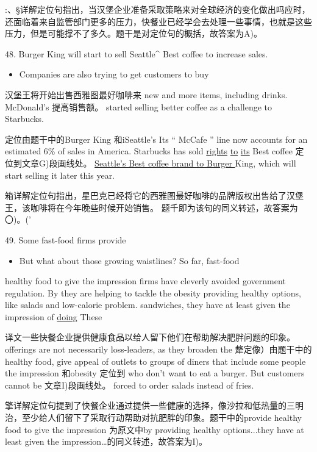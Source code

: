 \documentclass[UTF8,11pt]{ctexart}
\begin{document}
:、§详解定位句指出，当汉堡企业准备采取策略来对全球经济的变化做出吗应时，还面临着来自监管部门更多的压力，快餐业已经学会去处理一些事情，也就是这些压力，但是可能撑不了多久。题干是对定位句的概括，故答案为A)。


48. Burger King will start to sell Seattle\textasciicircum{} Best coffee to increase sales.


\begin{itemize}[leftmargin=2em,itemsep=.2em,topsep=.4em]\item[G.] Companies are also trying to get customers to buy
\end{itemize}

汉堡王将开始出售西雅图最好咖啡来 new and more items, including drinks. McDonald’s 提高销售额。 started selling better coffee as a challenge to Starbucks.


定位由题干中的Burger King 和iSeattle’s Its “ McCafe ” line now accounts for an estimated 6\% of sales in America. Starbucks has sold \uline{rights} \uline{to} \uline{its} Best coffee 定位到文章G)段画线处。 \uline{Seattle’s Best coffee brand to Burger }King, which will start selling it later this year.


箱详解定位句指出，星巴克已经将它的西雅图最好咖啡的品牌版权出售给了汉堡王，该咖啡将在今年晚些时候开始销售。 题千即为该句的同义转述，故答案为〇)。('


49. Some fast-food firms provide


\begin{itemize}[leftmargin=2em,itemsep=.2em,topsep=.4em]\item[I.] But what about those growing waistlines? So far, fast-food
\end{itemize}

healthy food to give the impression firms have cleverly avoided government regulation. By they are helping to tackle the obesity providing healthy options, like salads and low-calorie problem. sandwiches, they have at least given the impression of \uline{doing} These


译文一些快餐企业提供健康食品以给人留下他们在帮助解决肥胖问题的印象。 offerings are not necessarily loss-leaders, as they broaden the 犛定像）由题干中的healthy food, give appeal of outlets to groups of diners that include some people the impression 和obesity 定位到 who don’t want to eat a burger. But customers cannot be 文章I)段画线处。 forced to order salads instead of fries.


擎详解定位句提到了快餐企业通过提供一些健康的选择，像沙拉和低热量的三明治，至少给人们留下了采取行动帮助对抗肥胖的印象。题干中的provide healthy food to give the impression 为原文中by providing healthy options...they have at least given the impression…的同义转述，故答案为I)。
\end{document}
